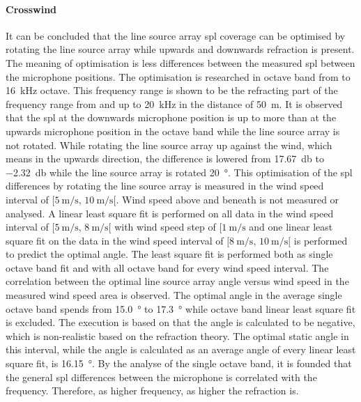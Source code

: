 \paragraph{Crosswind}
It can be concluded that the line source array \gls{spl} coverage can be optimised by rotating the line source array while upwards and downwards refraction is present. The meaning of optimisation is less differences between the measured \gls{spl} between the microphone positions. The optimisation is researched in octave band from  to \SI{16}{\kilo\hertz} octave. This frequency range is shown to be the refracting part of the frequency range from  and up to \SI{20}{\kilo\hertz} in the distance of \SI{50}{\meter}. It is observed that the \gls{spl} at the downwards microphone position is up to  more than at the upwards microphone position in the  octave band while the line source array is not rotated. While rotating the line source array up against the wind, which means in the upwards direction, the difference is lowered from \SI{17.67}{\decibel}  to \SI{-2.32}{\decibel} while the line source array is rotated \SI{20}{\degree}. This optimisation of the \gls{spl} differences by rotating the line source array is measured in the wind speed interval of $[\SI{5}{\meter\per\second},\, \SI{10}{\meter\per\second}[ $. Wind speed above and beneath is not measured or analysed. A linear least square fit is performed on all data in the wind speed interval of $[\SI{5}{\meter\per\second},\, \SI{8}{\meter\per\second}[ $ with wind speed step of $[\SI{1}{\meter\per\second}$ and one linear least square fit on the data in the wind speed interval of $[\SI{8}{\meter\per\second},\, \SI{10}{\meter\per\second}[ $ is performed to predict the optimal angle. The least square fit is performed both as single octave band fit and with all octave band for every wind speed interval. The correlation between the optimal line source array angle versus wind speed in the measured wind speed area is observed. The optimal angle in the average single octave band spends from \SI{15.0}{\degree} to \SI{17.3}{\degree} while  octave band linear least square fit is excluded. The execution is based on that the angle is calculated to be negative, which is non-realistic based on the refraction theory. The optimal static angle in this interval, while the angle is calculated as an average angle of every linear least square fit, is \SI{16.15}{\degree}. By the analyse of the single octave band, it is founded that the general \gls{spl} differences between the microphone is correlated with the frequency. Therefore, as higher frequency, as higher the refraction is.


